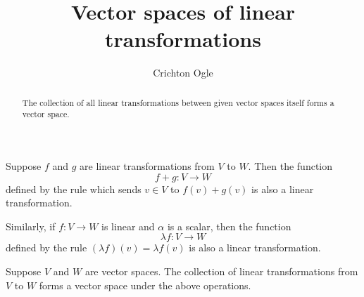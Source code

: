 \documentclass{ximera}
\title{Vector spaces of linear transformations}
\author{Crichton Ogle}
\begin{document}
\begin{abstract}
  The collection of all linear transformations between given vector
  spaces itself forms a vector space.
\end{abstract}
\maketitle

Suppose $f$ and $g$ are linear transformations from $V$ to $W$.  Then the function
\[
  f + g : V \to W
\]
defined by the rule which sends $v \in V$ to $f(v) + g(v)$ is also a
linear transformation.

Similarly, if $f : V \to W$ is linear and $\alpha$ is a scalar, then
the function
\[
  \lambda f : V \to W
\]
defined by the rule $(\lambda f)(v) = \lambda f(v)$ is also a linear
transformation.

\begin{theorem} Suppose $V$ and $W$ are vector spaces.  The collection
  of linear transformations from $V$ to $W$ forms a vector space under
  the above operations.
\end{theorem}

\end{document}
